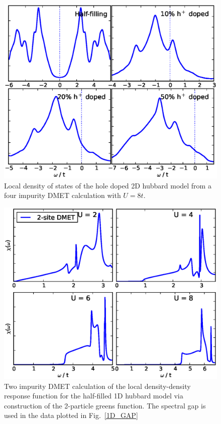 \documentclass[aps,showpacs,twocolumn,nobibnotes]{revtex4}
\begin{document}
\begin{figure}
\begin{center}
\includegraphics[scale=0.475]{Plots/Doping/2D/nImp4/U8/LargerBroadening/2DHub_Doping.eps}
\end{center}
\caption{Local density of states of the hole doped 2D hubbard model from a four impurity DMET calculation with $U = 8t$.}
\label{2D_Doped}
\end{figure}

\begin{figure}
\begin{center}
\includegraphics[scale=0.475]{Plots/1D_DD/1D_Hub_DD.eps}
\end{center}
\caption{Two impurity DMET calculation of the local density-density response function for the half-filled 1D hubbard model via construction of the 2-particle greens function.
The spectral gap is used in the data plotted in Fig.~\ref{1D_GAP}}
\label{1D_DD}
\end{figure}




\end{document}
